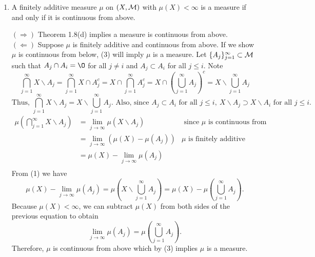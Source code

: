 \begin{enumerate}
\item A finitely additive measure $\mu$ on $(X, {\mathcal M})$ with $\mu(X)<\infty$ is a measure if and only if it is continuous from above.
\begin{pf}
$(\Rightarrow)$ Theorem 1.8(d) implies a measure is continuous from above. 
\\
$(\Leftarrow)$ Suppose $\mu$ is finitely additive and continuous from above. If we show $\mu$ is continuous from below, (3) will imply $\mu$ is a measure. Let $\{A_j\}_{j=1}^\infty \subset {\mathcal M}$ such that $A_j\cap A_i=\O$ for all $j\neq i$ and $A_j \subset A_{i}$ for all $j\leq i$. Note 
\[
\bigcap_{j=1}^\infty X\backslash A_j=\bigcap_{j=1}^\infty X\cap A_j^c= X \cap \bigcap_{j=1}^\infty A_j^c= X \cap \left(\bigcup_{j=1}^\infty A_j\right)^c=X \backslash \bigcup_{j=1}^\infty A_j\]
\begin{equation}
\text{Thus, }	\bigcap_{j=1}^\infty X\backslash A_j=X \backslash \bigcup_{j=1}^\infty A_j. \text{ Also, since } A_j \subset A_{i} \text{ for all } j\leq i,\ X\backslash A_j \supset X \backslash A_i \text{ for all }j \leq i.  
\end{equation}
\[
\begin{array}{lll}
	\mu\left(\bigcap_{j=1}^\infty X\backslash A_j \right) & =\underset{j\rightarrow \infty}{\lim}\mu(X\backslash A_j) & \text{ since $\mu$ is continuous from below}\\
	 & = \underset{j \rightarrow \infty}{\lim}(\mu(X)-\mu(A_j)) & \mu \text{ is finitely additive}\\
	 & = \mu(X)-\underset{j \rightarrow \infty}{\lim}\mu(A_j) & \\
\end{array}
\]
From (1) we have 
\[
\mu(X)-\underset{j \rightarrow \infty}{\lim}\mu(A_j)=\mu\left( X \backslash \bigcup_{j=1}^\infty A_j\right)= \mu(X) - \mu\left(\bigcup_{j=1}^\infty A_j\right).
\]
Because $\mu(X)<\infty$, we can subtract $\mu(X)$ from both sides of the previous equation to obtain
\[
\underset{j \rightarrow \infty}{\lim}\mu(A_j)=\mu\left(\bigcup_{j=1}^\infty A_j\right).
\]
Therefore, $\mu$ is continuous from above which by (3) implies $\mu$ is a measure. 
	
\end{pf}

\end{enumerate}
